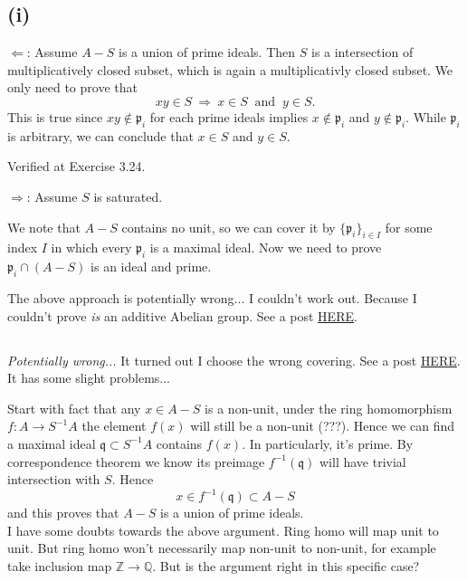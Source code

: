 \subsection{(i)}

$\Leftarrow$: Assume $A-S$ is a union of prime ideals. Then $S$ is a intersection of multiplicatively closed subset, which is again a multiplicativly closed subset. We only need to prove that 
$$xy\in S ~\Rightarrow~ x\in S ~\text{ and }~ y\in S.$$
This is true since $xy\notin \mathfrak p_i$ for each prime ideals implies $x\notin\mathfrak p_i$ and $y\notin\mathfrak p_i$. While $\mathfrak p_i$ is arbitrary, we can conclude that $x\in S$ and $y\in S$.

Verified at \cite{altman} Exercise 3.24. 

$\Rightarrow$: Assume $S$ is saturated. 

We note that $A-S$ contains no unit, so we can cover it by $\{\mathfrak p_i\}_{i\in I}$ for some index $I$ in which every $\mathfrak p_i$ is a maximal ideal. 
Now we need to prove $\mathfrak p_i\cap (A-S)$ is an ideal and prime. 

The above approach is potentially wrong... I couldn't work out. Because I couldn't prove \textit{is} an additive Abelian group. 
See a post \href{https://math.stackexchange.com/questions/4329999/saturated-set-and-union-of-prime-ideals}{HERE}. 

\subsection{}
\textit{Potentially wrong...}
It turned out I choose the wrong covering. See a post \href{https://math.stackexchange.com/questions/3988316/proof-verification-atiyah-macdonald-exercise-3-7i}{HERE}. It has some slight problems...

Start with fact that any $x\in A-S$ is a non-unit, under the ring homomorphism $f:A\to S^{-1}A$ the element $f(x)$ will still be a non-unit (???). Hence we can find a maximal ideal $\mathfrak q\subset S^{-1}A$ contains $f(x)$. In particularly, it's prime. By correspondence theorem we know its preimage $f^{-1}(\mathfrak q)$ will have trivial intersection with $S$. Hence 
$$x\in f^{-1}(\mathfrak q)\subset A-S$$ and this proves that $A-S$ is a union of prime ideals.\\

I have some doubts towards the above argument. Ring homo will map unit to unit. But ring homo won't necessarily map non-unit to non-unit, for example take inclusion map $\mathbb Z\to \mathbb Q$. 
But is the argument right in this specific case?

